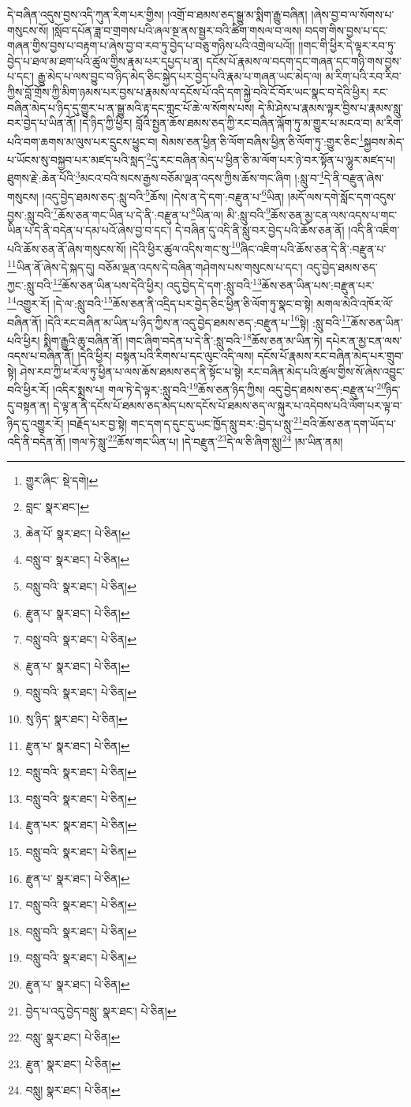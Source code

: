 དེ་བཞིན་འདུས་བྱས་འདི་ཀུན་རིག་པར་གྱིས། །འགྲོ་བ་ཐམས་ཅད་སྒྱུ་མ་སྨིག་རྒྱུ་བཞིན། །ཞེས་བྱ་བ་ལ་སོགས་པ་གསུངས་སོ། །སློབ་དཔོན་ཟླ་བ་གྲགས་པའི་ཞལ་སྔ་ནས་སྦྱར་བའི་ཚིག་གསལ་བ་ལས། བདག་གིས་བྱས་པ་དང་གཞན་གྱིས་བྱས་པ་བརྟག་པ་ཞེས་བྱ་བ་རབ་ཏུ་བྱེད་པ་བཅུ་གཉིས་པའི་འགྲེལ་པའོ།། །།གང་གི་ཕྱིར་དེ་ལྟར་རབ་ཏུ་བྱེད་པ་ཐལ་མ་ཐག་པའི་ཚུལ་གྱིས་རྣམ་པར་དཔྱད་པ་ན། དངོས་པོ་རྣམས་ལ་བདག་དང་གཞན་དང་གཉི་གས་བྱས་པ་དང་། རྒྱུ་མེད་པ་ལས་བྱུང་བ་ཉིད་མེད་ཅིང་སྐྱེད་པར་བྱེད་པའི་རྣམ་པ་གཞན་ཡང་མེད་ལ། མ་རིག་པའི་རབ་རིབ་ཀྱིས་བློ་གྲོས་ཀྱི་མིག་ཉམས་པར་བྱས་པ་རྣམས་ལ་དངོས་པོ་འདི་དག་སྐྱེ་བའི་ངོ་བོར་ཡང་སྣང་བ་དེའི་ཕྱིར། རང་བཞིན་མེད་པ་ཉིད་དུ་གྱུར་པ་ན་སྒྱུ་མའི་རྟ་དང་གླང་པོ་ཆེ་ལ་སོགས་པས། དེ་མི་ཤེས་པ་རྣམས་ལྟར་བྱིས་པ་རྣམས་སླུ་བར་བྱེད་པ་ཡིན་ནོ། །དེ་ཉིད་ཀྱི་ཕྱིར། བློའི་སྤྱན་ཆོས་ཐམས་ཅད་ཀྱི་རང་བཞིན་ལྐོག་ཏུ་མ་གྱུར་པ་མངའ་བ། མ་རིག་པའི་བག་ཆགས་མ་ལུས་པར་དྲུངས་ཕྱུང་བ། སེམས་ཅན་ཕྱིན་ཅི་ལོག་བཞིས་ཕྱིན་ཅི་ལོག་ཏུ་:གྱུར་ཅིང་\footnote{གྱུར་ཞིང་  སྡེ་དགེ། }སྐྱབས་མེད་པ་ཡོངས་སུ་བསྐྱབ་པར་མཛད་པའི་སླད་\footnote{བླང་  སྣར་ཐང་། }དུ་རང་བཞིན་མེད་པ་ཕྱིན་ཅི་མ་ལོག་པར་ཉེ་བར་སྟོན་པ་ལྷུར་མཛད་པ། ཐུགས་རྗེ་:ཆེན་པོའི་\footnote{ཆེན་པོ་  སྣར་ཐང་།  པེ་ཅིན། }མངའ་བའི་སངས་རྒྱས་བཅོམ་ལྡན་འདས་ཀྱིས་ཆོས་གང་ཞིག །:སླུ་བ་\footnote{བསླུ་བ་  སྣར་ཐང་།  པེ་ཅིན། }དེ་ནི་བརྫུན་ཞེས་གསུངས། །འདུ་བྱེད་ཐམས་ཅད་:སླུ་བའི་\footnote{བསླུ་བའི་  སྣར་ཐང་།  པེ་ཅིན། }ཆོས། །དེས་ན་དེ་དག་:བརྫུན་པ་\footnote{རྫུན་པ་  སྣར་ཐང་།  པེ་ཅིན། }ཡིན། །མདོ་ལས་དགེ་སློང་དག་འདུས་བྱས་:སླུ་བའི་\footnote{བསླུ་བའི་  སྣར་ཐང་།  པེ་ཅིན། }ཆོས་ཅན་གང་ཡིན་པ་དེ་ནི་:བརྫུན་པ་\footnote{རྫུན་པ་  སྣར་ཐང་།  པེ་ཅིན། }ཡིན་ལ། མི་:སླུ་བའི་\footnote{བསླུ་བའི་  སྣར་ཐང་།  པེ་ཅིན། }ཆོས་ཅན་མྱ་ངན་ལས་འདས་པ་གང་ཡིན་པ་དེ་ནི་བདེན་པ་དམ་པའོ་ཞེས་བྱ་བ་དང་། དེ་བཞིན་དུ་འདི་ནི་སླུ་བར་བྱེད་པའི་ཆོས་ཅན་ནོ། །འདི་ནི་འཇིག་པའི་ཆོས་ཅན་ནོ་ཞེས་གསུངས་སོ། །དེའི་ཕྱིར་ཚུལ་འདིས་གང་སུ་\footnote{སུ་ཉིད་  སྣར་ཐང་།  པེ་ཅིན། }ཞིང་འཇིག་པའི་ཆོས་ཅན་དེ་ནི་:བརྫུན་པ་\footnote{རྫུན་པ་  སྣར་ཐང་།  པེ་ཅིན། }ཡིན་ནོ་ཞེས་དེ་སྐད་དུ། བཅོམ་ལྡན་འདས་དེ་བཞིན་གཤེགས་པས་གསུངས་པ་དང་། འདུ་བྱེད་ཐམས་ཅད་ཀྱང་:སླུ་བའི་\footnote{བསླུ་བའི་  སྣར་ཐང་།  པེ་ཅིན། }ཆོས་ཅན་ཡིན་པས་དེའི་ཕྱིར། འདུ་བྱེད་དེ་དག་:སླུ་བའི་\footnote{བསླུ་བའི་  སྣར་ཐང་།  པེ་ཅིན། }ཆོས་ཅན་ཡིན་པས་:བརྫུན་པར་\footnote{རྫུན་པར་  སྣར་ཐང་།  པེ་ཅིན། }འགྱུར་རོ། །དེ་ལ་:སླུ་བའི་\footnote{བསླུ་བའི་  སྣར་ཐང་།  པེ་ཅིན། }ཆོས་ཅན་ནི་འདྲིད་པར་བྱེད་ཅིང་ཕྱིན་ཅི་ལོག་ཏུ་སྣང་བ་སྟེ། མགལ་མེའི་འཁོར་ལོ་བཞིན་ནོ། །དེའི་རང་བཞིན་མ་ཡིན་པ་ཉིད་ཀྱིས་ན་འདུ་བྱེད་ཐམས་ཅད་:བརྫུན་པ་\footnote{རྫུན་པ་  སྣར་ཐང་།  པེ་ཅིན། }སྟེ། :སླུ་བའི་\footnote{བསླུ་བའི་  སྣར་ཐང་།  པེ་ཅིན། }ཆོས་ཅན་ཡིན་པའི་ཕྱིར། སྨིག་རྒྱུའི་ཆུ་བཞིན་ནོ། །གང་ཞིག་བདེན་པ་དེ་ནི་:སླུ་བའི་\footnote{བསླུ་བའི་  སྣར་ཐང་།  པེ་ཅིན། }ཆོས་ཅན་མ་ཡིན་ཏེ། དཔེར་ན་མྱ་ངན་ལས་འདས་པ་བཞིན་ནོ། །དེའི་ཕྱིར། བསྟན་པའི་རིགས་པ་དང་ལུང་འདི་ལས། དངོས་པོ་རྣམས་རང་བཞིན་མེད་པར་གྲུབ་སྟེ། ཤེས་རབ་ཀྱི་ཕ་རོལ་ཏུ་ཕྱིན་པ་ལས་ཆོས་ཐམས་ཅད་ནི་སྟོང་པ་སྟེ། རང་བཞིན་མེད་པའི་ཚུལ་གྱིས་སོ་ཞེས་འབྱུང་བའི་ཕྱིར་རོ། །འདིར་སྨྲས་པ། གལ་ཏེ་དེ་ལྟར་:སླུ་བའི་\footnote{བསླུ་བའི་  སྣར་ཐང་།  པེ་ཅིན། }ཆོས་ཅན་ཉིད་ཀྱིས། འདུ་བྱེད་ཐམས་ཅད་:བརྫུན་པ་\footnote{རྫུན་པ་  སྣར་ཐང་།  པེ་ཅིན། }ཉིད་དུ་བསྟན་ན། དེ་ལྟ་ན་ནི་དངོས་པོ་ཐམས་ཅད་མེད་པས་དངོས་པོ་ཐམས་ཅད་ལ་སྐུར་པ་འདེབས་པའི་ལོག་པར་ལྟ་བ་ཉིད་དུ་འགྱུར་རོ། །བརྗོད་པར་བྱ་སྟེ། གང་དག་ད་དུང་དུ་ཡང་ཁྱོད་སླུ་བར་:བྱེད་པ་སླུ་\footnote{བྱེད་པ་འདུ་བྱེད་བསླུ་  སྣར་ཐང་།  པེ་ཅིན། }བའི་ཆོས་ཅན་དག་ཡོད་པ་འདི་ནི་བདེན་ནོ། །གལ་ཏེ་སླུ་\footnote{བསླུ་  སྣར་ཐང་།  པེ་ཅིན། }ཆོས་གང་ཡིན་པ། །དེ་བརྫུན་\footnote{རྫུན་  སྣར་ཐང་།  པེ་ཅིན། }དེ་ལ་ཅི་ཞིག་སླུ།\footnote{བསླུ།  སྣར་ཐང་།  པེ་ཅིན། } །མ་ཡིན་ནམ། 